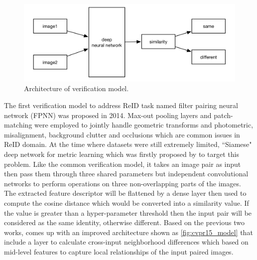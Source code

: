 \begin{figure}
    \includegraphics[width=\linewidth]{figures/verification_model.png}
    \caption{Architecture of verification model.}
    \label{fig:vft_model}
\end{figure}

The first verification model to address ReID task named filter pairing
neural network (FPNN) \cite{first-pairwise-net-for-reid-2014} was proposed in 
2014. Max-out pooling layers and patch-matching were employed to jointly handle 
geometric transforms and photometric, misalignment, background clutter and 
occlusions which are common issues in ReID domain.
At the time where datasets were still extremely limited, ``Siamese" deep 
network for metric learning which was firstly
proposed by \cite{first-siamese-net-for-reid-2014} to target this problem. 
Like the common verification model, it takes an image pair as input then pass 
them through three shared parameters but independent convolutional networks to 
perform operations on three non-overlapping parts of the images. The extracted 
feature descriptor will be flattened by a dense layer then used to
compute the cosine distance which would be converted into a similarity value. 
If the value is greater than a hyper-parameter threshold then the input pair 
will be considered as the same identity, otherwise different.
Based on the previous two works, \cite{an-improved-dl-archit-2015} comes up 
with an improved architecture shown as \autoref{fig:cvpr15_model} that include 
a layer to calculate cross-input neighborhood differences which based on 
mid-level features to capture local relationships of the input paired images.

